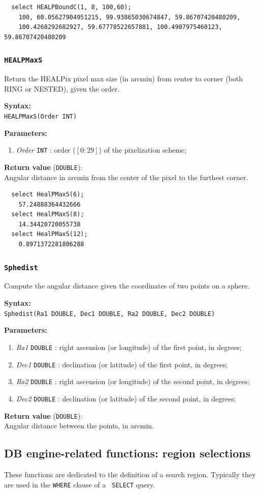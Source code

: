 \documentclass[10pt,titlepage]{article}
\newcommand{\syntax}[1]
{
  \bigskip
  \noindent
  \textbf{Syntax:} \\ 
  \indent \texttt{#1}
}
\newenvironment{parameters}
{
  \medskip
  \noindent
  \textbf{Parameters:}
  \begin{enumerate}
}
{
  \end{enumerate}
}
\newcommand{\param}[2]
{
  \item \textit{#1} \texttt{#2} 
}
\newcommand{\return}[1]
{
  \medskip
  \noindent
  \textbf{Return value} (\texttt{#1}): \\
  \indent
}
\newcommand{\example}
{
\medskip
\noindent{\textbf{Example:}}
}
\begin{document}
\example
%
\begin{verbatim}
  select HEALPBoundC(1, 8, 100,60);
    100, 60.05627904951215, 99.93865030674847, 59.86707420480209,
    100.4268292682927, 59.67778522657881, 100.4907975460123, 59.86707420480209
\end{verbatim}
%
%

\subsubsection{{\tt HEALPMaxS}}
Return the HEALPix pixel max size (in arcmin) from center to corner
(both RING or NESTED), given the order.

\syntax{HEALPMaxS(Order INT)}

\begin{parameters}
  \param{Order}{INT}: order ($[0:29]$) of the pixelization scheme;
\end{parameters}

\return{DOUBLE} Angular distance in arcmin from the center of the pixel to the
furthest corner.

\example
%
\begin{verbatim}
  select HealPMaxS(6);
    57.24888364432666
  select HealPMaxS(8);
    14.34420720055738
  select HealPMaxS(12);
    0.8971372281806288
\end{verbatim}
%
%

\subsubsection{{\tt Sphedist}}
Compute the angular distance given the coordinates of two points
on a sphere.

\syntax{Sphedist(Ra1 DOUBLE, Dec1 DOUBLE, Ra2 DOUBLE, Dec2 DOUBLE)}

\begin{parameters}
  \param{Ra1}{DOUBLE}: right ascension (or longitude) of the
  first point, in degrees;
  \param{Dec1}{DOUBLE}: declination (or latitude) of the first
  point, in degrees;
  \param{Ra2}{DOUBLE}: right ascension (or longitude) of the
  second point, in degrees;
  \param{Dec2}{DOUBLE}: declination (or latitude) of the second
  point, in degrees;
\end{parameters}

\return{DOUBLE} Angular distance between the points, in arcmin.



%
\subsection{DB engine-related functions: region selections}
These functions are dedicated to the definition of a search
region. Typically they are used in the {\tt WHERE} clause of a {\tt
  SELECT} query.
\end{document}
